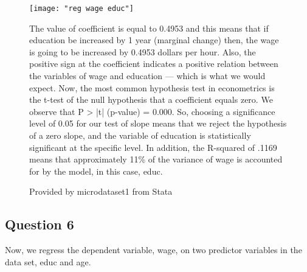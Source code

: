 \documentclass{article}
\begin{document}
\begin{figure}
	\begin{Center}
	\texttt{[image: "reg wage educ"]}
	\caption{Provided by microdataset1 from Stata}
	\label{fig:reg-wage-educ}
	\end{Center}
	\vspace {0.5\baselineskip}
	
	The value of coefficient is equal to 0.4953 and this means that if education be increased by 1 year (marginal change) then, the wage is going to be increased by 0.4953 dollars per hour. Also, the positive sign at the coefficient indicates a positive relation between the variables of wage and education — which is what we would expect. Now, the most common hypothesis test in econometrics is the t-test of the null hypothesis that a coefficient equals zero. We observe that P  > |t| (p-value) = 0.000. So, choosing a significance level of 0.05 for our test of slope means that we reject the hypothesis of a zero slope, and the variable of education is statistically significant at the specific level. In addition, the R-squared of .1169 means that approximately 11\% of the variance of wage is accounted for by the model, in this case, educ. 
\end{figure}
	\vspace {0.5\baselineskip}
	

	\subsection{Question 6}
	\vspace {0.5\baselineskip}
	
	Now, we regress the dependent variable, wage, on two predictor variables in the data set, educ and age.
	\vspace {0.5\baselineskip}
	
\end{document}

